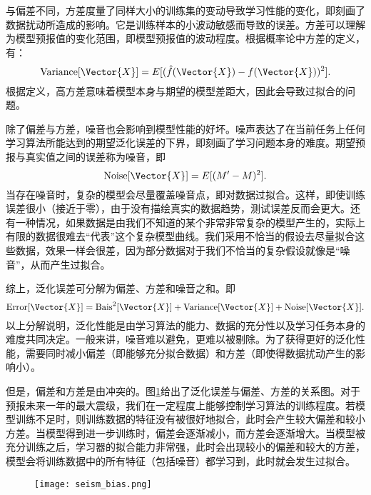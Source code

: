 与偏差不同，方差度量了同样大小的训练集的变动导致学习性能的变化，即刻画了数据扰动所造成的影响。它是训练样本的小波动敏感而导致的误差。方差可以理解为模型预报值的变化范围，即模型预报值的波动程度。根据概率论中方差的定义，有：
\begin{equation}
  \mathrm{Variance}[\Vector{X}]=E[(\hat{f}(\Vector{X})-f(\Vector{X}))^2].
\end{equation}
根据定义，高方差意味着模型本身与期望的模型差距大，因此会导致过拟合的问题。

除了偏差与方差，噪音也会影响到模型性能的好坏。噪声表达了在当前任务上任何学习算法所能达到的期望泛化误差的下界，即刻画了学习问题本身的难度。期望预报与真实值之间的误差称为噪音，即
\begin{equation}
  \mathrm{Noise}[\Vector{X}]=E[(M^{\prime}-M)^2].
\end{equation}
当存在噪音时，复杂的模型会尽量覆盖噪音点，即对数据过拟合。这样，即使训练误差很小（接近于零），由于没有描绘真实的数据趋势，测试误差反而会更大。还有一种情况，如果数据是由我们不知道的某个非常非常复杂的模型产生的，实际上有限的数据很难去“代表”这个复杂模型曲线。我们采用不恰当的假设去尽量拟合这些数据，效果一样会很差，因为部分数据对于我们不恰当的复杂假设就像是“噪音”，从而产生过拟合。

综上，泛化误差可分解为偏差、方差和噪音之和。即
\begin{equation}
  \mathrm{Error}[\Vector{X}]=\mathrm{Bais}^2[\Vector{X}]+\mathrm{Variance}[\Vector{X}]+\mathrm{Noise}[\Vector{X}].
\end{equation}
以上分解说明，泛化性能是由学习算法的能力、数据的充分性以及学习任务本身的难度共同决定。一般来讲，噪音难以避免，更难以被剔除。为了获得更好的泛化性能，需要同时减小偏差（即能够充分拟合数据）和方差（即使得数据扰动产生的影响小）。

但是，偏差和方差是由冲突的。图\ref{fig:seism_bias}给出了泛化误差与偏差、方差的关系图。对于预报未来一年的最大震级，我们在一定程度上能够控制学习算法的训练程度。若模型训练不足时，则训练数据的特征没有被很好地拟合，此时会产生较大偏差和较小方差。当模型得到进一步训练时，偏差会逐渐减小，而方差会逐渐增大。当模型被充分训练之后，学习器的拟合能力非常强，此时会出现较小的偏差和较大的方差，模型会将训练数据中的所有特征（包括噪音）都学习到，此时就会发生过拟合。

\begin{figure}[!htbp]
    \centering
    \texttt{[image: seism\_bias.png]}
    \label{fig:seism_bias}
\end{figure}

